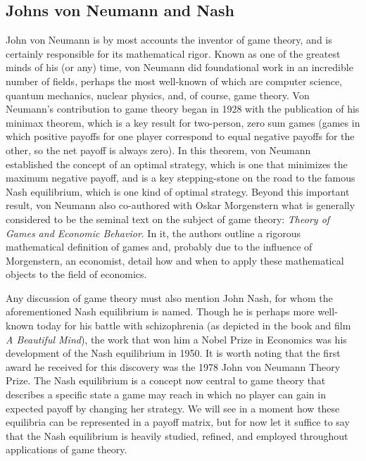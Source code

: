 \documentclass[notitlepage,reqno]{amsart}
\begin{document}
\subsection{Johns von Neumann and Nash}
John von Neumann is by most accounts the inventor of game theory, and is certainly responsible for its mathematical rigor. Known as one of the greatest minds of his (or any) time\cite{glimm}, von Neumann did foundational work in an incredible number of fields, perhaps the most well-known of which are computer science, quantum mechanics, nuclear physics, and, of course, game theory. Von Neumann's contribution to game theory began in 1928 with the publication of his minimax theorem, which is a key result for two-person, zero sum games (games in which positive payoffs for one player correspond to equal negative payoffs for the other, so the net payoff is always zero). In this theorem, von Neumann established the concept of an optimal strategy, which is one that minimizes the maximum negative payoff, and is a key stepping-stone on the road to the famous Nash equilibrium, which is one kind of optimal strategy. Beyond this important result, von Neumann also co-authored with Oskar Morgenstern what is generally considered to be the seminal text on the subject of game theory: \emph{Theory of Games and Economic Behavior}\cite{vonNeumann}. In it, the authors outline a rigorous mathematical definition of games and, probably due to the influence of Morgenstern, an economist, detail how and when to apply these mathematical objects to the field of economics. 

Any discussion of game theory must also mention John Nash, for whom the aforementioned Nash equilibrium is named. Though he is perhaps more well-known today for his battle with schizophrenia (as depicted in the book and film \emph{A Beautiful Mind}), the work that won him a Nobel Prize in Economics was his development of the Nash equilibrium in 1950. It is worth noting that the first award he received for this discovery was the 1978 John von Neumann Theory Prize. The Nash equilibrium is a concept now central to game theory that describes a specific state a game may reach in which no player can gain in expected payoff by changing her strategy\cite{rubinstein}. We will see in a moment how these equilibria can be represented in a payoff matrix, but for now let it suffice to say that the Nash equilibrium is heavily studied, refined, and employed throughout applications of game theory.
\end{document}
